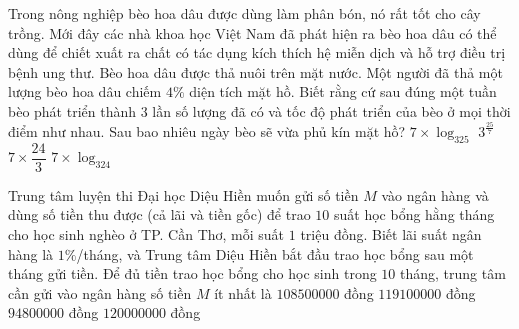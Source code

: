 \begin{ex}%
	Trong nông nghiệp bèo hoa dâu được dùng làm phân bón, nó rất tốt cho cây trồng. Mới đây các nhà khoa học Việt Nam đã phát hiện ra bèo hoa dâu có thể dùng để chiết xuất ra chất có tác dụng kích thích hệ miễn dịch và hỗ trợ điều trị bệnh ung thư. Bèo hoa dâu được thả nuôi trên mặt nước. Một người đã thả một lượng bèo hoa dâu chiếm $4\%$ diện tích mặt hồ. Biết rằng cứ sau đúng một tuần bèo phát triển thành $3$ lần số lượng đã có và tốc độ phát triển của bèo ở mọi thời điểm như nhau. Sau bao nhiêu ngày bèo sẽ vừa phủ kín mặt hồ?
	\choice
	{\True $7\times\log_325$}
	{$3^{\tfrac{25}{7}}$}
	{$7\times\dfrac{24}{3}$}
	{$7\times\log_324$}
\end{ex}
\begin{ex}%
	Trung tâm luyện thi Đại học Diệu Hiền muốn gửi số tiền $M$ vào ngân hàng và dùng số tiền thu được (cả lãi và tiền gốc) để trao $10$ suất học bổng hằng tháng cho học sinh nghèo ở TP. Cần Thơ, mỗi suất $1$ triệu đồng. Biết lãi suất ngân hàng là $1\%$/tháng, và Trung tâm Diệu Hiền bắt đầu trao học bổng sau một tháng gửi tiền. Để đủ tiền trao học bổng cho học sinh trong $10$ tháng, trung tâm cần gửi vào ngân hàng số tiền $M$ ít nhất là 
	\choice
	{$108500000$ đồng}
	{$119100000$ đồng}
	{\True $94800000$ đồng}
	{$120000000$ đồng}
\end{ex}
